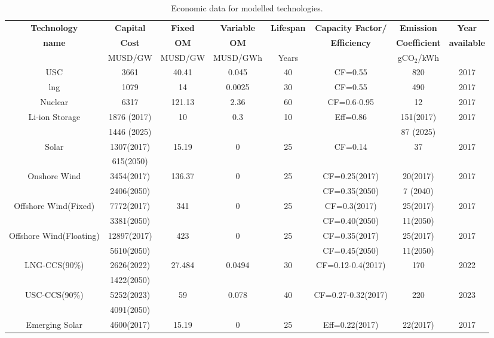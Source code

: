 \begin{landscape}
\begin{longtable}{ |*{8}{c|} }
\caption{Economic data for modelled technologies.}\\
\hline
\textbf{Technology} & \textbf{Capital} & \textbf{Fixed} & \textbf{Variable} & \textbf{Lifespan} & \textbf{Capacity Factor/} & \textbf{Emission} & \textbf{Year} \\
\textbf{name} & \textbf{Cost} & \textbf{\gls{OM}} & \textbf{\gls{OM}} &  & \textbf{Efficiency} & \textbf{Coefficient} & \textbf{available} \\
 & MUSD/GW & MUSD/GW & MUSD/GWh & Years  &  & gCO$_2$/kWh  &  \\
\hline
\endhead  %
\hline
\endfoot  %
\hline
\endlastfoot
\gls{USC} & 3661 & 40.41 & 0.045 & 40 & CF=0.55 & 820 & 2017 \\
\gls{lng} & 1079 & 14 & 0.0025 & 30 & CF=0.55 & 490 & 2017 \\
Nuclear & 6317 & 121.13 & 2.36 & 60 & CF=0.6-0.95 & 12 & 2017 \\
Li-ion Storage & 1876 (2017) & 10 & 0.3 & 10 & Eff=0.86 & 151(2017) & 2017 \\
 & 1446 (2025) &  &  &  &  & 87 (2025) &  \\
Solar & 1307(2017) & 15.19 & 0  & 25 & CF=0.14 & 37 & 2017 \\
 & 615(2050) & & & & & &  \\
Onshore Wind & 3454(2017) & 136.37 & 0 & 25 & CF=0.25(2017) & 20(2017) & 2017 \\
 & 2406(2050) &  &  &  & CF=0.35(2050) & 7 (2040) &  \\
Offshore Wind(Fixed) & 7772(2017) & 341 & 0 & 25 & CF=0.3(2017) & 25(2017) & 2017 \\
 & 3381(2050) &  &  & & CF=0.40(2050) & 11(2050) &  \\
Offshore Wind(Floating) & 12897(2017) & 423 & 0 & 25 & CF=0.35(2017) & 25(2017) & 2017 \\
 & 5610(2050) &  &  &  & CF=0.45(2050) & 11(2050) &  \\
LNG-CCS(90\%) & 2626(2022) & 27.484 & 0.0494 & 30 & CF=0.12-0.4(2017) & 170 & 2022 \\
 & 1422(2050) &  & &  &  &  & \\
USC-CCS(90\%) & 5252(2023) & 59 & 0.078 & 40 & CF=0.27-0.32(2017) & 220 & 2023 \\
 & 4091(2050) &  &  &  &  &  & \\
Emerging Solar & 4600(2017) & 15.19 & 0 & 25 & Eff=0.22(2017) & 22(2017) & 2017 \\

\end{longtable}
\end{landscape}
